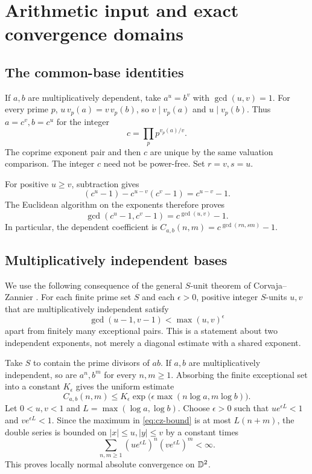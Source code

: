 \section{Arithmetic input and exact convergence domains}
\label{sec:convergence}

\subsection{The common-base identities}

If \(a,b\) are multiplicatively dependent, take \(a^u=b^v\) with
\(\gcd(u,v)=1\). For every prime \(p\),
\(u\,v_p(a)=v\,v_p(b)\), so \(v\mid v_p(a)\) and \(u\mid v_p(b)\).
Thus \(a=c^v,b=c^u\) for the integer
\[
c=\prod_p p^{v_p(a)/v}.
\]
The coprime exponent pair and then \(c\) are unique by the same
valuation comparison. The integer \(c\) need not be power-free.
Set \(r=v,s=u\).

For positive \(u\geq v\), subtraction gives
\[
(c^u-1)-c^{u-v}(c^v-1)=c^{u-v}-1.
\]
The Euclidean algorithm on the exponents therefore proves
\begin{equation}\label{eq:same-base}
\gcd(c^u-1,c^v-1)=c^{\gcd(u,v)}-1.
\end{equation}
In particular, the dependent coefficient is
\(C_{a,b}(n,m)=c^{\gcd(rn,sm)}-1\).

\subsection{Multiplicatively independent bases}

We use the following consequence of the general \(S\)-unit theorem
of Corvaja--Zannier \citep[Corollary 1 and (1.3), public version 2]{cz2005}.
For each finite prime set \(S\) and each \(\epsilon>0\), positive
integer \(S\)-units \(u,v\) that are multiplicatively independent
satisfy
\[
\gcd(u-1,v-1)<\max(u,v)^\epsilon
\]
apart from finitely many exceptional pairs.
This is a statement about two independent exponents, not merely a
diagonal estimate with a shared exponent.

Take \(S\) to contain the prime divisors of \(ab\). If \(a,b\) are
multiplicatively independent, so are \(a^n,b^m\) for every \(n,m\geq1\).
Absorbing the finite exceptional set into a constant \(K_\epsilon\)
gives the uniform estimate
\begin{equation}\label{eq:cz-bound}
C_{a,b}(n,m)
\leq K_\epsilon
\exp\bigl(\epsilon\max(n\log a,m\log b)\bigr).
\end{equation}
Let \(0<u,v<1\) and \(L=\max(\log a,\log b)\).
Choose \(\epsilon>0\) such that
\(u e^{\epsilon L}<1\) and \(v e^{\epsilon L}<1\).
Since the maximum in \eqref{eq:cz-bound} is at most \(L(n+m)\),
the double series is bounded on \(|x|\leq u,|y|\leq v\) by a
constant times
\[
\sum_{n,m\geq1}(u e^{\epsilon L})^n(v e^{\epsilon L})^m<\infty.
\]
This proves locally normal absolute convergence on \(\mathbb D^2\).

